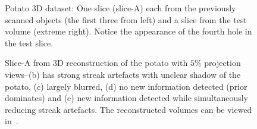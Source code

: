 \documentclass[journal]{IEEEtran}
\begin{document}
\begin{figure}[!h]
\begin{subfigure}[b]{0.235\linewidth}
\captionsetup{labelformat=empty}
\caption{}
\label{fig:potato3D_test}
     \end{subfigure}
      \caption{Potato 3D dataset: One slice (slice-A) each from the previously scanned objects (the first three from left) and a slice from the test 
        volume (extreme right). Notice the appearance of the fourth
        hole in the test slice. }
\label{fig:object-prior_test_potato_A}
\end{figure}

\begin{figure}[!h]
\centering
{}\hfill
{}\hfill
{}\hfill
{}\hfill
{}
\caption{Slice-A from 3D reconstruction of the potato with $5\%$ projection views--(b) has strong streak artefacts with unclear shadow of the potato, (c) largely blurred, (d) no new information detected (prior dominates) and (e) new information detected while simultaneously reducing streak artefacts. The reconstructed volumes can be viewed in~\cite{supp_paper}.}
\label{fig:potato_3D_results_A}
\end{figure}
\end{document}
